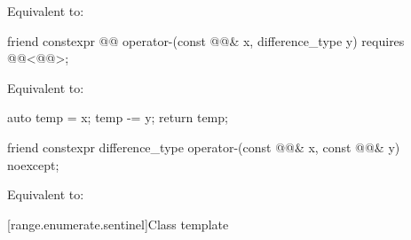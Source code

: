 \begin{itemdescr}
\pnum
\effects
Equivalent to: 
\end{itemdescr}

%
\begin{itemdecl}
friend constexpr @@ operator-(const @@& x, difference_type y)
  requires @@<@@>;
\end{itemdecl}

\begin{itemdescr}
\pnum
\effects
Equivalent to:
\begin{codeblock}
auto temp = x;
temp -= y;
return temp;
\end{codeblock}
\end{itemdescr}

%
\begin{itemdecl}
friend constexpr difference_type operator-(const @@& x, const @@& y) noexcept;
\end{itemdecl}

\begin{itemdescr}
\pnum
\effects
Equivalent to: 
\end{itemdescr}

[range.enumerate.sentinel]{Class template }

